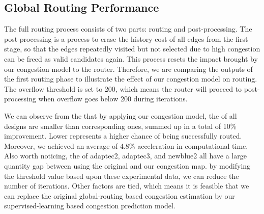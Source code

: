 \subsection{Global Routing Performance}
The full routing process consists of two parts: routing and post-processing. The post-processing is a process to erase the history cost of all edges from the first stage, so that the edges repeatedly visited but not selected due to high congestion can be freed as valid candidates again. This process resets the impact brought by our congestion model to the router. Therefore, we are comparing the outputs of the first routing phase to illustrate the effect of our congestion model on routing. The overflow threshold is set to 200, which means the router will proceed to post-processing when overflow goes below 200 during iterations.

We can observe from the  that by applying our congestion model, the  of all designs are smaller than corresponding ones, summed up in a total of 10\% improvement. Lower  represents a higher chance of being successfully routed. Moreover, we achieved an average of 4.8\% acceleration in computational time. Also worth noticing, the  of adaptec2, adaptec3, and newblue2 all have a large quantity gap between using the original and our congestion map. by modifying the threshold value based upon these experimental data, we can reduce the number of iterations. Other factors are tied, which means it is feasible that we can replace the original global-routing based congestion estimation by our supervised-learning based congestion prediction model.


